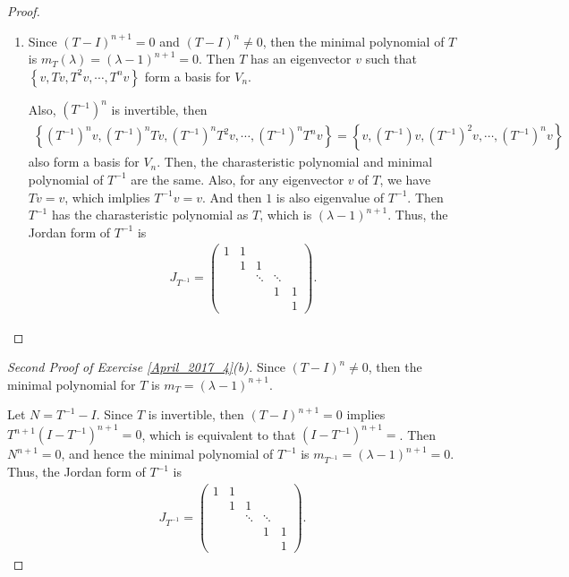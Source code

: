 \documentclass[11pt]{article}
\theoremstyle{definition}
\numberwithin{equation}{subsection}
\begin{document}
\begin{proof}
\begin{enumerate}[label=(\alph*)]
    \item Since $(T - I)^{n+1} = 0$ and $(T - I)^{n} \neq 0$, then the minimal polynomial of $T$ is $m_T(\lambda) = (\lambda - 1)^{n+1} = 0$. Then $T$ has an eigenvector $v$ such that $\left\{v, Tv, T^2v, \cdots, T^nv \right\}$ form a basis for $V_n$. 
    
    Also, $(T^{-1})^n$ is invertible, then
    \begin{align*}
        \left\{(T^{-1})^nv, (T^{-1})^nTv, (T^{-1})^nT^2v, \cdots, (T^{-1})^nT^nv \right\} = \left\{v, (T^{-1})v, (T^{-1})^2v, \cdots, (T^{-1})^nv \right\}
    \end{align*}
    also form a basis for $V_n$. Then, the charasteristic polynomial and minimal polynomial of $T^{-1}$ are the same. Also, for any eigenvector $v$ of $T$, we have $Tv = v$, which imlplies $T^{-1}v = v$. And then $1$ is also eigenvalue of $T^{-1}$. Then $T^{-1}$ has the charasteristic polynomial as $T$, which is $(\lambda - 1)^{n+1}$. Thus, the Jordan form of $T^{-1}$ is 
    \begin{align*}
        J_{T^{-1}} = \begin{pmatrix}
            1 & 1 &  &  & \\
              & 1 & 1 &  & \\
              &   & \ddots & \ddots \\
              &   &        &  1 & 1 \\
              &   &        &    & 1
        \end{pmatrix}.
    \end{align*}
\end{enumerate}
\end{proof}

\begin{proof}[Second Proof of Exercise \ref{April_2017_4}(b)]
Since $(T - I)^n \neq 0$, then the minimal polynomial for $T$ is $m_T = (\lambda - 1)^{n+1}$.

Let $N = T^{-1} - I$. Since $T$ is invertible, then $(T - I)^{n+1} = 0$ implies $T^{n+1}(I - T^{-1})^{n+1} = 0$, which is equivalent to that $(I - T^{-1})^{n+1} = $. Then $N^{n+1} = 0$, and hence the minimal polynomial of $T^{-1}$ is $m_{T^{-1}} = (\lambda - 1)^{n+1} = 0$. Thus, the Jordan form of $T^{-1}$ is 
\begin{align*}
    J_{T^{-1}} = \begin{pmatrix}
        1 & 1 &  &  & \\
        & 1 & 1 &  & \\
        &   & \ddots & \ddots \\
        &   &        &  1 & 1 \\
        &   &        &    & 1
    \end{pmatrix}.
\end{align*}
\end{proof}
\end{document}
